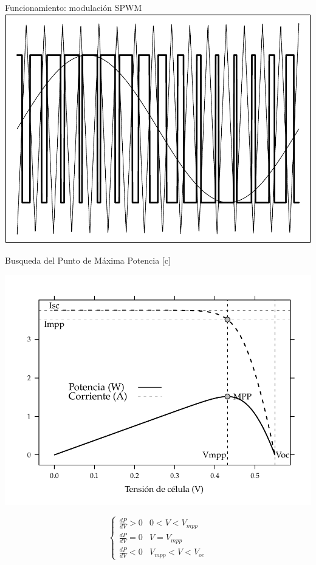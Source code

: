 \documentclass[xcolor={usenames,svgnames,dvipsnames}]{beamer}
\begin{document}
\begin{frame}[label=sec-2-0-12]{Funcionamiento: modulación SPWM}
\includegraphics[width=.9\linewidth]{../figs/SPWMMonofasico.pdf}
\end{frame}

\begin{frame}[label=sec-2-0-13]{Busqueda del Punto de Máxima Potencia}
[c]

\includegraphics[width=.9\linewidth]{../figs/CurvaIV_Ta20_G800.pdf}

$$\begin{cases}
      \frac{dP}{dV}>0 & 0<V<V_{mpp}\\
      \frac{dP}{dV}=0 & V=V_{mpp}\\
      \frac{dP}{dV}<0 & V_{mpp}<V<V_{oc}\end{cases}$$
\end{frame}
\end{document}
